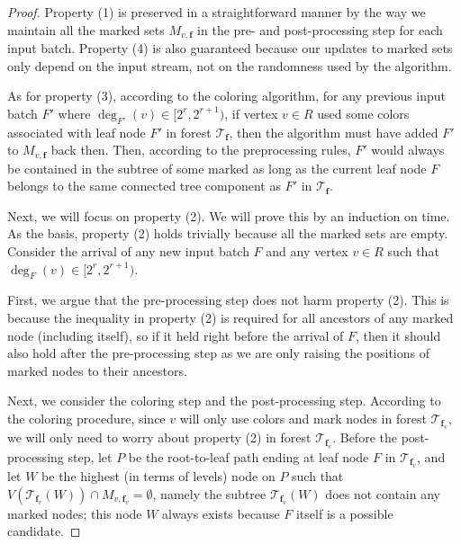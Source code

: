 \documentclass[11pt,a4paper]{article}
\newcommand{\tree}{\mathcal{T}}
\newcommand{\freq}{\mathbf{f}}
\begin{document}
\begin{proof}
	Property (1) is preserved in a straightforward manner by the way we maintain all the marked sets $M_{v, \freq}$ in the pre- and post-processing step for each input batch. Property (4) is also guaranteed because our updates to marked sets only depend on the input stream, not on the randomness used by the algorithm.
	
	As for property (3), according to the coloring algorithm, for any previous input batch $F'$ where $\deg_{F'}(v)\in [2^r, 2^{r+1})$, if vertex $v\in R$ used some colors associated with leaf node $F'$ in forest $\tree_{\freq}$, then the algorithm must have added $F'$ to $M_{v, \freq}$ back then. Then, according to the preprocessing rules, $F'$ would always be contained in the subtree of some marked as long as the current leaf node $F$ belongs to the same connected tree component as $F'$ in $\tree_{\freq}$.
	
	Next, we will focus on property (2). We will prove this by an induction on time. As the basis, property (2) holds trivially because all the marked sets are empty. Consider the arrival of any new input batch $F$ and any vertex $v\in R$ such that $\deg_F(v)\in [2^r, 2^{r+1})$. 
	
	First, we argue that the pre-processing step does not harm property (2). This is because the inequality in property (2) is required for all ancestors of any marked node (including itself), so if it held right before the arrival of $F$, then it should also hold after the pre-processing step as we are only raising the positions of marked nodes to their ancestors.
	
	Next, we consider the coloring step and the post-processing step. According to the coloring procedure, since $v$ will only use colors and mark nodes in forest $\tree_{\freq_v}$, we will only need to worry about property (2) in forest $\tree_{\freq_v}$. Before the post-processing step, let $P$ be the root-to-leaf path ending at leaf node $F$ in $\tree_{\freq_v}$, and let $W$ be the highest (in terms of levels) node on $P$ such that \(V(\tree_{\freq_v}(W))\cap M_{v, \freq_v} = \emptyset\), namely the subtree $\tree_{\freq_v}(W)$ does not contain any marked nodes; this node $W$ always exists because $F$ itself is a possible candidate.
	

\end{proof}
\end{document}
